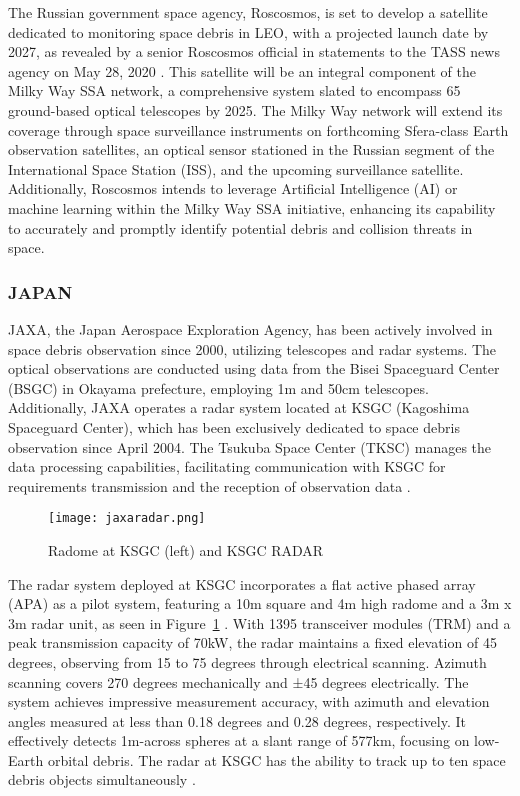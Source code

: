 The Russian government space agency, Roscosmos, is set to develop a satellite dedicated to monitoring space debris in LEO, with a projected launch date by 2027, as revealed by a senior Roscosmos official in statements to the TASS news agency on May 28, 2020 \cite{tass}. This satellite will be an integral component of the Milky Way SSA network, a comprehensive system slated to encompass 65 ground-based optical telescopes by 2025. The Milky Way network will extend its coverage through space surveillance instruments on forthcoming Sfera-class Earth observation satellites, an optical sensor stationed in the Russian segment of the International Space Station (ISS), and the upcoming surveillance satellite. Additionally, Roscosmos intends to leverage Artificial Intelligence (AI) or machine learning within the Milky Way SSA initiative, enhancing its capability to accurately and promptly identify potential debris and collision threats in space\cite{tass}.\\


\subsubsection{JAPAN}

JAXA, the Japan Aerospace Exploration Agency, has been actively involved in space debris observation since 2000, utilizing telescopes and radar systems. The optical observations are conducted using data from the Bisei Spaceguard Center (BSGC) in Okayama prefecture, employing 1m and 50cm telescopes. Additionally, JAXA operates a radar system located at KSGC (Kagoshima Spaceguard Center), which has been exclusively dedicated to space debris observation since April 2004. The Tsukuba Space Center (TKSC) manages the data processing capabilities, facilitating communication with KSGC for requirements transmission and the reception of observation data \cite{jaxa1}.\\

\begin{figure}[h!]
	\centering
	\texttt{[image: jaxaradar.png]}
	\caption{Radome at KSGC (left) and KSGC RADAR \cite{jaxa5}}\label{fig:jaxrad}
\end{figure}

The radar system deployed at KSGC incorporates a flat active phased array (APA) as a pilot system, featuring a 10m square and 4m high radome and a 3m x 3m radar unit, as seen in Figure~\ref{fig:jaxrad} \cite{jaxa3}. With 1395 transceiver modules (TRM) and a peak transmission capacity of 70kW, the radar maintains a fixed elevation of 45 degrees, observing from 15 to 75 degrees through electrical scanning. Azimuth scanning covers 270 degrees mechanically and ±45 degrees electrically. The system achieves impressive measurement accuracy, with azimuth and elevation angles measured at less than 0.18 degrees and 0.28 degrees, respectively. It effectively detects 1m-across spheres at a slant range of 577km, focusing on low-Earth orbital debris. The radar at KSGC has the ability to track up to ten space debris objects simultaneously \cite{jaxa2}.\\

